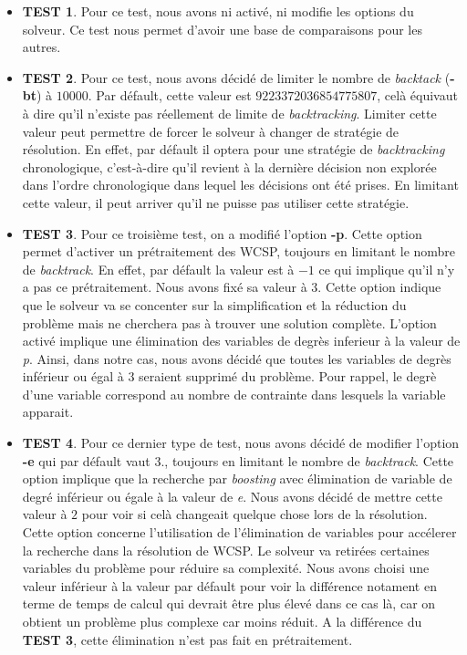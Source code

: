 \documentclass[a4paper, 10pt]{article}
\begin{document}
      \begin{itemize}
        \item \textbf{TEST 1}. Pour ce test, nous avons ni activé, ni modifie les options du solveur. Ce test nous permet d'avoir une base de comparaisons pour les autres.
        \item \textbf{TEST 2}. Pour ce test, nous avons décidé de limiter le nombre de \textit{backtack} (\textbf{-bt}) à $10000$. Par défault, cette valeur est $9223372036854775807$, celà équivaut à dire qu'il n'existe pas réellement de limite de \textit{backtracking}. Limiter cette valeur peut permettre de forcer le solveur à changer de stratégie de résolution. En effet, par défault il optera pour une stratégie de \textit{backtracking} chronologique, c'est-à-dire qu'il revient à la dernière décision non explorée dans l'ordre chronologique dans lequel les décisions ont été prises. En limitant cette valeur, il peut arriver qu'il ne puisse pas utiliser cette stratégie.
        \item \textbf{TEST 3}. Pour ce troisième test, on a modifié l'option \textbf{-p}. Cette option permet d'activer un prétraitement des WCSP, toujours en limitant le nombre de \textit{backtrack}. En effet, par défault la valeur est à $-1$ ce qui implique qu'il n'y a pas ce prétraitement. Nous avons fixé sa valeur à $3$. Cette option indique que le solveur va se concenter sur la simplification et la réduction du problème mais ne cherchera pas à trouver une solution complète. L'option activé implique une élimination des variables de degrès inferieur à la valeur de \textit{p}. Ainsi, dans notre cas, nous avons décidé que toutes les variables de degrès inférieur ou égal à $3$ seraient supprimé du problème. Pour rappel, le degrè d'une variable correspond au nombre de contrainte dans lesquels la variable apparait.
        \item \textbf{TEST 4}. Pour ce dernier type de test, nous avons décidé de modifier l'option \textbf{-e} qui par défault vaut $3$., toujours en limitant le nombre de \textit{backtrack}. Cette option implique que la recherche par \textit{boosting} avec élimination de variable de degré inférieur ou égale à la valeur de \textit{e}. Nous avons décidé de mettre cette valeur à $2$ pour voir si celà changeait quelque chose lors de la résolution. Cette option concerne l'utilisation de l'élimination de variables pour accélerer la recherche dans la résolution de WCSP. Le solveur va retirées certaines variables du problème pour réduire sa complexité. Nous avons choisi une valeur inférieur à la valeur par défault pour voir la différence notament en terme de temps de calcul qui devrait être plus élevé dans ce cas là, car on obtient un problème plus complexe car moins réduit. A la différence du \textbf{TEST 3}, cette élimination n'est pas fait en prétraitement.
      \end{itemize}
\end{document}
